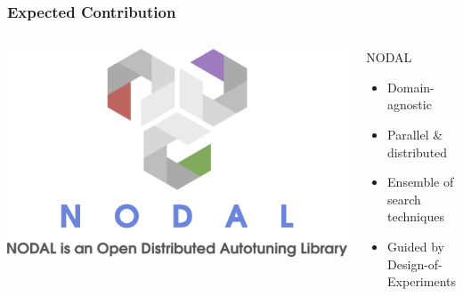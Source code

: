 \documentclass[10pt, compress, aspectratio=169]{beamer}
\begin{document}
\begin{frame}
    \frametitle{Expected Contribution}
    \begin{columns}[c]
        \begin{center}
            \includegraphics[width=\columnwidth]{logo}
        \end{center}

        \begin{block}{NODAL}
            \begin{itemize}
                \item \alert{Domain-agnostic}
                \item \alert{Parallel \& distributed}
                \item \alert{Ensemble} of search techniques
                \item Guided by \alert{Design-of-Experiments}
            \end{itemize}
        \end{block}

    \end{columns}
\end{frame}
\end{document}
